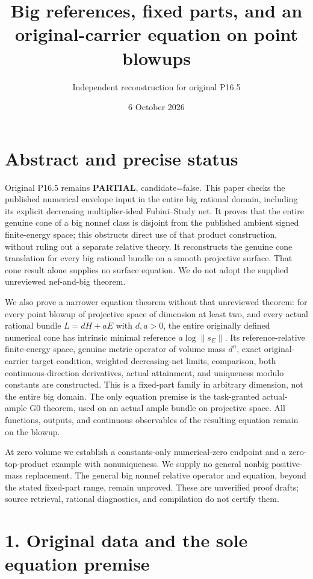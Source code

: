 \documentclass[
  10pt,
]{article}
\title{Big references, fixed parts, and an original-carrier equation on
point blowups}
\author{Independent reconstruction for original P16.5}
\date{6 October 2026}
\begin{document}
\maketitle

\section{Abstract and precise status}\label{abstract-and-precise-status}

Original P16.5 remains \textbf{PARTIAL}, candidate=false. This paper
checks the published numerical envelope input in the entire big rational
domain, including its explicit decreasing multiplier-ideal Fubini--Study
net. It proves that the entire genuine cone of a big nonnef class is
disjoint from the published ambient signed finite-energy space; this
obstructs direct use of that product construction, without ruling out a
separate relative theory. It reconstructs the genuine cone translation
for every big rational bundle on a smooth projective surface. That cone
result alone supplies no surface equation. We do not adopt the supplied
unreviewed nef-and-big theorem.

We also prove a narrower equation theorem without that unreviewed
theorem: for every point blowup of projective space of dimension at
least two, and every actual rational bundle \(L=dH+aE\) with \(d,a>0\),
the entire originally defined numerical cone has intrinsic minimal
reference \(a\log\|s_E\|\). Its reference-relative finite-energy space,
genuine metric operator of volume mass \(d^n\), exact original-carrier
target condition, weighted decreasing-net limits, comparison, both
continuous-direction derivatives, actual attainment, and uniqueness
modulo constants are constructed. This is a fixed-part family in
arbitrary dimension, not the entire big domain. The only equation
premise is the task-granted actual-ample G0 theorem, used on an actual
ample bundle on projective space. All functions, outputs, and continuous
observables of the resulting equation remain on the blowup.

At zero volume we establish a constants-only numerical-zero endpoint and
a zero-top-product example with nonuniqueness. We supply no general
nonbig positive-mass replacement. The general big nonnef relative
operator and equation, beyond the stated fixed-part range, remain
unproved. These are unverified proof drafts; source retrieval, rational
diagnostics, and compilation do not certify them.

\section{1. Original data and the sole equation
premise}\label{original-data-and-the-sole-equation-premise}
\end{document}
